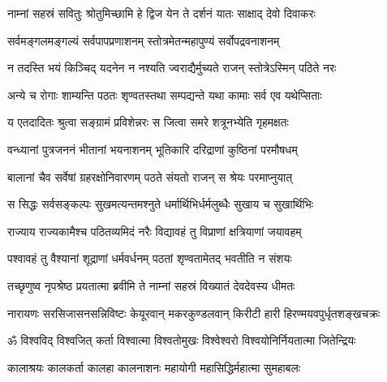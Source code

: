 
\twolineshloka
{नाम्नां सहस्रं सवितुः श्रोतुमिच्छामि हे द्विज}
{येन ते दर्शनं यातः साक्षाद् देवो दिवाकरः}

\twolineshloka
{सर्वमङ्गलमङ्गल्यं सर्वपापप्रणाशनम्}
{स्तोत्रमेतन्महापुण्यं सर्वोपद्रवनाशनम्}

\twolineshloka
{न तदस्ति भयं किञ्चिद् यदनेन न नश्यति}
{ज्वराद्यैर्मुच्यते राजन् स्तोत्रेऽस्मिन् पठिते नरः}

\twolineshloka
{अन्ये च रोगाः शाम्यन्ति पठतः शृण्वतस्तथा}
{सम्पद्यन्ते यथा कामाः सर्व एव यथेप्सिताः}

\twolineshloka
{य एतदादितः श्रुत्वा सङ्ग्रामं प्रविशेन्नरः}
{स जित्वा समरे शत्रूनभ्येति गृहमक्षतः}

\twolineshloka
{वन्ध्यानां पुत्रजननं भीतानां भयनाशनम्}
{भूतिकारि दरिद्राणां कुष्ठिनां परमौषधम्}

\twolineshloka
{बालानां चैव सर्वेषां ग्रहरक्षोनिवारणम्}
{पठते संयतो राजन् स श्रेयः परमाप्नुयात्}

\twolineshloka
{स सिद्धः सर्वसङ्कल्पः सुखमत्यन्तमश्नुते}
{धर्मार्थिभिर्धर्मलुब्धैः सुखाय च सुखार्थिभिः}

\twolineshloka
{राज्याय राज्यकामैश्च पठितव्यमिदं नरैः}
{विद्यावहं तु विप्राणां क्षत्रियाणां जयावहम्}

\twolineshloka
{पश्वावहं तु वैश्यानां शूद्राणां धर्मवर्धनम्}
{पठतां शृण्वतामेतद् भवतीति न संशयः}

\twolineshloka
{तच्छृणुष्व नृपश्रेष्ठ प्रयतात्मा ब्रवीमि ते}
{नाम्नां सहस्रं विख्यातं देवदेवस्य धीमतः}


{नारायणः सरसिजासनसन्निविष्टः}
{केयूरवान् मकरकुण्डलवान् किरीटी}
{हारी हिरण्मयवपुर्धृतशङ्खचक्रः}

\resetShloka
{}
\twolineshloka
{ॐ विश्वविद् विश्वजित् कर्ता विश्वात्मा विश्वतोमुखः}
{विश्वेश्वरो विश्वयोनिर्नियतात्मा जितेन्द्रियः}%

\twolineshloka
{कालाश्रयः कालकर्ता कालहा कालनाशनः}
{महायोगी महासिद्धिर्महात्मा सुमहाबलः}%

